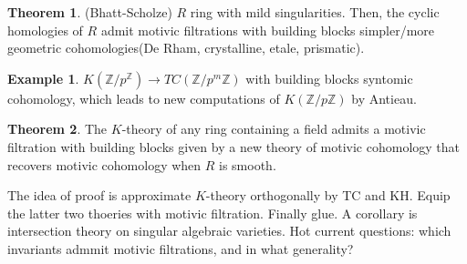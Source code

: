 \documentclass{article}
\theoremstyle{definition}
\newtheorem{theorem}{Theorem}[section]
\theoremstyle{definition}
\theoremstyle{definition}
\theoremstyle{definition}
\theoremstyle{definition}
\theoremstyle{definition}
\theoremstyle{definition}
\newtheorem{example}{Example}[section]
\begin{document}
 
 \begin{tcolorbox}[colback=red!5!white,colframe=red!30!white]
 \begin{theorem}
 (Bhatt-Scholze) $R$ ring with mild singularities. Then, the cyclic homologies of $R$ admit motivic filtrations with building blocks simpler/more geometric cohomologies(De Rham, crystalline, etale, prismatic).
 \end{theorem}
 \end{tcolorbox}

\begin{tcolorbox}[colback=yellow!5!white,colframe=yellow!30!white]
\begin{example}
$K(\mathbb{Z}/p^\mathbb{Z})\to TC(\mathbb{Z}/p^m \mathbb{Z})$ with building blocks syntomic cohomology, which leads to new computations of $K(\mathbb{Z}/p \mathbb{Z})$ by Antieau. 
\end{example}
\end{tcolorbox}


\begin{tcolorbox}[colback=red!5!white,colframe=red!30!white]
\begin{theorem}
The $K$-theory of any ring containing a field admits a motivic filtration with building blocks given by a new theory of motivic cohomology that recovers motivic cohomology when $R$ is smooth.  
\end{theorem}
\end{tcolorbox}
The idea of proof is approximate $K$-theory orthogonally by TC and KH. Equip the latter two thoeries with motivic filtration. Finally glue. A corollary is intersection theory on singular algebraic varieties. Hot current questions: which invariants admmit motivic filtrations, and in what generality?
\end{document}
